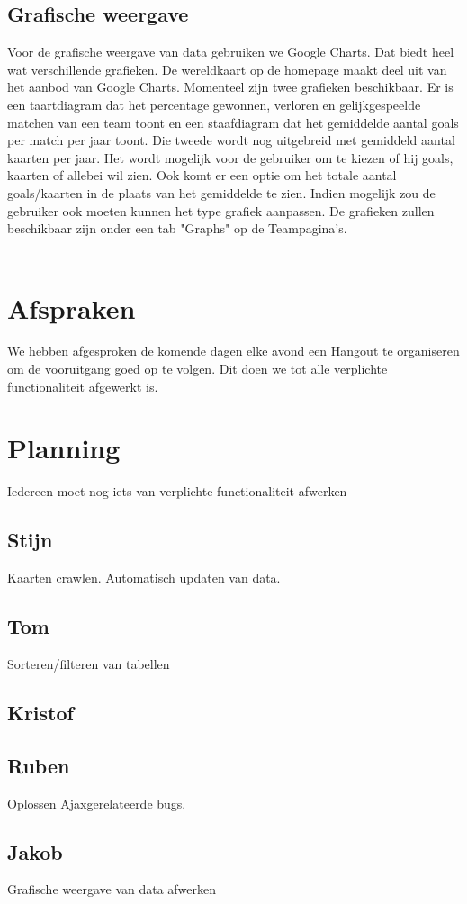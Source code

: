 \documentclass[11pt, a4paper]{article}
\begin{document}
\subsection{Grafische weergave}
Voor de grafische weergave van data gebruiken we Google Charts. Dat biedt heel wat verschillende grafieken. De wereldkaart op de homepage maakt deel uit van het aanbod van Google Charts. Momenteel zijn twee grafieken beschikbaar. Er is een taartdiagram dat het percentage gewonnen, verloren en gelijkgespeelde matchen van een team toont en een staafdiagram dat het gemiddelde aantal goals per match per jaar toont. Die tweede wordt nog uitgebreid met gemiddeld aantal kaarten per jaar. Het wordt mogelijk voor de gebruiker om te kiezen of hij goals, kaarten of allebei wil zien. Ook komt er een optie om het totale aantal goals/kaarten in de plaats van het gemiddelde te zien. Indien mogelijk zou de gebruiker ook moeten kunnen het type grafiek aanpassen. De grafieken zullen beschikbaar zijn onder een tab "Graphs" op de Teampagina's.
\\
\\
\section{Afspraken}
We hebben afgesproken de komende dagen elke avond een Hangout te organiseren om de vooruitgang goed op te volgen. Dit doen we tot alle verplichte functionaliteit afgewerkt is.


\section{Planning}
Iedereen moet nog iets van verplichte functionaliteit afwerken
\subsection{Stijn}
Kaarten crawlen. Automatisch updaten van data.
\subsection{Tom}
Sorteren/filteren van tabellen
\subsection{Kristof}

\subsection{Ruben}
Oplossen Ajaxgerelateerde bugs. 
\subsection{Jakob}
Grafische weergave van data afwerken
\end{document}
